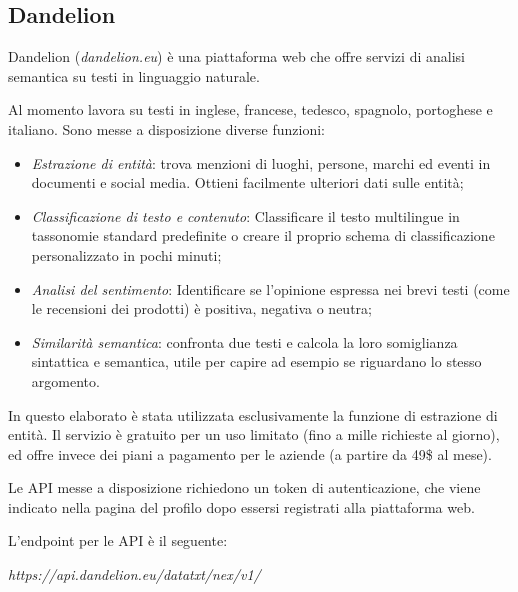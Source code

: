 \documentclass[a4paper,11pt]{article}
\begin{document}
\subsection{Dandelion}
\label{extractor:dandelion}
Dandelion (\textit{dandelion.eu}) è una piattaforma web che offre servizi di analisi semantica su testi in linguaggio naturale. \cite{dandelion}

Al momento lavora su testi in inglese, francese, tedesco, spagnolo, portoghese e italiano. Sono messe a disposizione diverse funzioni:

\begin{itemize}
	\item \textit{Estrazione di entità}: trova menzioni di luoghi, persone, marchi ed eventi in documenti e social media. Ottieni facilmente ulteriori dati sulle entità;
	\item \textit{Classificazione di testo e contenuto}: Classificare il testo multilingue in tassonomie standard predefinite o creare il proprio schema di classificazione personalizzato in pochi minuti;
	\item \textit{Analisi del sentimento}: Identificare se l'opinione espressa nei brevi testi (come le recensioni dei prodotti) è positiva, negativa o neutra;
	\item \textit{Similarità semantica}: confronta due testi e calcola la loro somiglianza sintattica e semantica, utile per capire ad esempio se riguardano lo stesso argomento.
\end{itemize}

In questo elaborato è stata utilizzata esclusivamente la funzione di estrazione di entità. Il servizio è gratuito per un uso limitato (fino a mille richieste al giorno), ed offre invece dei piani a pagamento per le aziende (a partire da 49\$ al mese).

Le API messe a disposizione richiedono un token di autenticazione, che viene indicato nella pagina del profilo dopo essersi registrati alla piattaforma web.

L'endpoint per le API è il seguente:
\newline

\textit{https://api.dandelion.eu/datatxt/nex/v1/}
\newline
\end{document}
